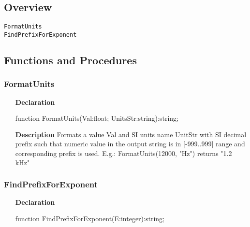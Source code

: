 \documentclass[12pt,a4paper,oneside]{report}
\newcommand{\declarationitem}[1]{\textbf{#1}}
\newcommand{\descriptiontitle}[1]{\textbf{#1}}
\begin{document}
\subsection{Overview}
\begin{description}
	\item[\texttt{FormatUnits}]
	\item[\texttt{FindPrefixForExponent}]
\end{description}
\subsection{Functions and Procedures}
\subsubsection{FormatUnits}
\label{lmunitsformat-FormatUnits}
\begin{itemize}\item[\declarationitem{Declaration}\hfill]
	\begin{flushleft}
		\begin{ttfamily}
			function FormatUnits(Val:float; UnitsStr:string):string;\end{ttfamily}
		
	\end{flushleft}
	
	\par
	\item[\descriptiontitle{Description}]
	Formats a value Val and SI units name UnitStr with SI decimal prefix such that numeric value in the output string is in [{-}999..999] range and corresponding prefix is used. E.g.: FormatUnits(12000, "Hz") returns "1.2 kHz"
	
\end{itemize}
\subsubsection{FindPrefixForExponent}
\label{lmunitsformat-FindPrefixForExponent}
\begin{itemize}\item[\declarationitem{Declaration}\hfill]
	\begin{flushleft}
		\begin{ttfamily}
			function FindPrefixForExponent(E:integer):string;\end{ttfamily}
		
	\end{flushleft}
	
\end{itemize}
\end{document}
